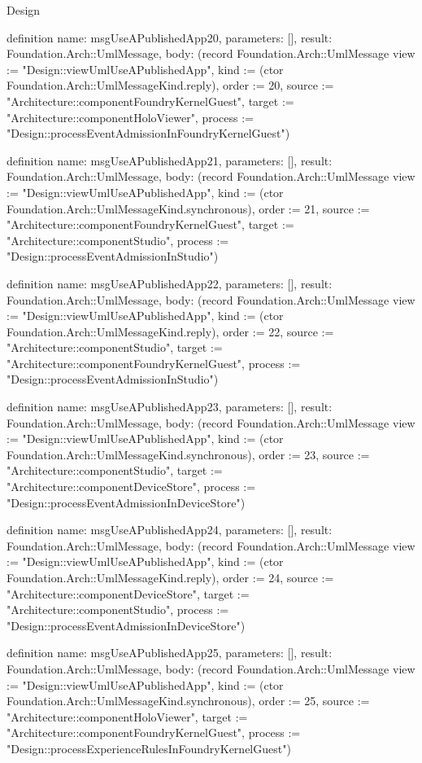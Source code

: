 \begin{lexlean}{Design}
\begin{semanticmodule}
definition{
  name: msgUseAPublishedApp20,
  parameters: [],
  result: Foundation.Arch::UmlMessage,
  body: (record Foundation.Arch::UmlMessage {view := "Design::viewUmlUseAPublishedApp", kind := (ctor Foundation.Arch::UmlMessageKind.reply), order := 20, source := "Architecture::componentFoundryKernelGuest", target := "Architecture::componentHoloViewer", process := "Design::processEventAdmissionInFoundryKernelGuest"})
}

definition{
  name: msgUseAPublishedApp21,
  parameters: [],
  result: Foundation.Arch::UmlMessage,
  body: (record Foundation.Arch::UmlMessage {view := "Design::viewUmlUseAPublishedApp", kind := (ctor Foundation.Arch::UmlMessageKind.synchronous), order := 21, source := "Architecture::componentFoundryKernelGuest", target := "Architecture::componentStudio", process := "Design::processEventAdmissionInStudio"})
}

definition{
  name: msgUseAPublishedApp22,
  parameters: [],
  result: Foundation.Arch::UmlMessage,
  body: (record Foundation.Arch::UmlMessage {view := "Design::viewUmlUseAPublishedApp", kind := (ctor Foundation.Arch::UmlMessageKind.reply), order := 22, source := "Architecture::componentStudio", target := "Architecture::componentFoundryKernelGuest", process := "Design::processEventAdmissionInStudio"})
}

definition{
  name: msgUseAPublishedApp23,
  parameters: [],
  result: Foundation.Arch::UmlMessage,
  body: (record Foundation.Arch::UmlMessage {view := "Design::viewUmlUseAPublishedApp", kind := (ctor Foundation.Arch::UmlMessageKind.synchronous), order := 23, source := "Architecture::componentStudio", target := "Architecture::componentDeviceStore", process := "Design::processEventAdmissionInDeviceStore"})
}

definition{
  name: msgUseAPublishedApp24,
  parameters: [],
  result: Foundation.Arch::UmlMessage,
  body: (record Foundation.Arch::UmlMessage {view := "Design::viewUmlUseAPublishedApp", kind := (ctor Foundation.Arch::UmlMessageKind.reply), order := 24, source := "Architecture::componentDeviceStore", target := "Architecture::componentStudio", process := "Design::processEventAdmissionInDeviceStore"})
}

definition{
  name: msgUseAPublishedApp25,
  parameters: [],
  result: Foundation.Arch::UmlMessage,
  body: (record Foundation.Arch::UmlMessage {view := "Design::viewUmlUseAPublishedApp", kind := (ctor Foundation.Arch::UmlMessageKind.synchronous), order := 25, source := "Architecture::componentHoloViewer", target := "Architecture::componentFoundryKernelGuest", process := "Design::processExperienceRulesInFoundryKernelGuest"})
}


\end{semanticmodule}
\end{lexlean}
